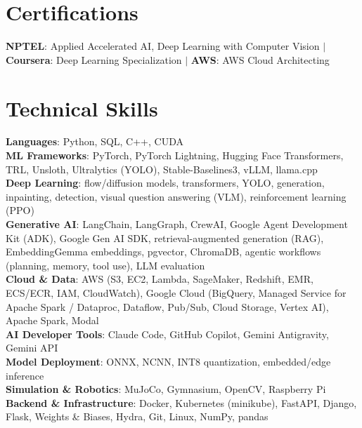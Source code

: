 \documentclass[letterpaper,11pt]{article}
\begin{document}
\section{Certifications}
 \begin{itemize}[leftmargin=0.15in, label={}]
    \small{\item{
     \textbf{NPTEL}{: Applied Accelerated AI, Deep Learning with Computer Vision} \hspace{3pt}$|$\hspace{3pt} \textbf{Coursera}{: Deep Learning Specialization} \hspace{3pt}$|$\hspace{3pt} \textbf{AWS}{: AWS Cloud Architecting}
    }}
 \end{itemize}

\section{Technical Skills}
 \begin{itemize}[leftmargin=0.15in, label={}]
    \small{\item{
     \textbf{Languages}{: Python, SQL, C++, CUDA} \\
     \textbf{ML Frameworks}{: PyTorch, PyTorch Lightning, Hugging Face Transformers, TRL, Unsloth, Ultralytics (YOLO), Stable-Baselines3, vLLM, llama.cpp} \\
     \textbf{Deep Learning}{: flow/diffusion models, transformers, YOLO, generation, inpainting, detection, visual question answering (VLM), reinforcement learning (PPO)} \\
     \textbf{Generative AI}{: LangChain, LangGraph, CrewAI, Google Agent Development Kit (ADK), Google Gen AI SDK, retrieval-augmented generation (RAG), EmbeddingGemma embeddings, pgvector, ChromaDB, agentic workflows (planning, memory, tool use), LLM evaluation} \\
     \textbf{Cloud \& Data}{: AWS (S3, EC2, Lambda, SageMaker, Redshift, EMR, ECS/ECR, IAM, CloudWatch), Google Cloud (BigQuery, Managed Service for Apache Spark / Dataproc, Dataflow, Pub/Sub, Cloud Storage, Vertex AI), Apache Spark, Modal} \\
     \textbf{AI Developer Tools}{: Claude Code, GitHub Copilot, Gemini Antigravity, Gemini API} \\
     \textbf{Model Deployment}{: ONNX, NCNN, INT8 quantization, embedded/edge inference} \\
     \textbf{Simulation \& Robotics}{: MuJoCo, Gymnasium, OpenCV, Raspberry Pi} \\
     \textbf{Backend \& Infrastructure}{: Docker, Kubernetes (minikube), FastAPI, Django, Flask, Weights \& Biases, Hydra, Git, Linux, NumPy, pandas}
    }}
 \end{itemize}
\end{document}
